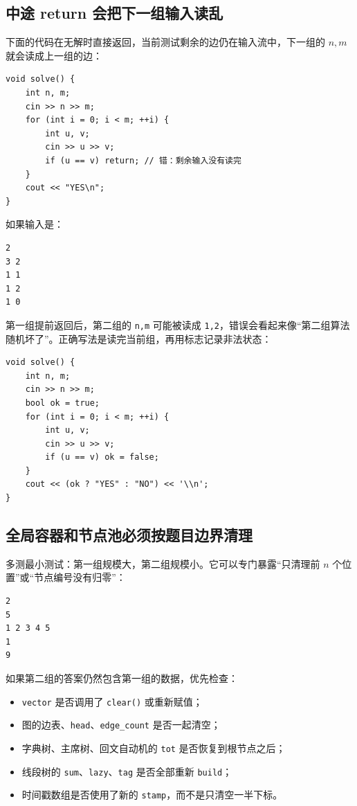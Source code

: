 \documentclass[UTF8,openany,oneside,zihao=-4]{ctexbook}
\begin{document}
\subsection{中途 return 会把下一组输入读乱}

下面的代码在无解时直接返回，当前测试剩余的边仍在输入流中，下一组的 $n,m$ 就会读成上一组的边：

\begin{lstlisting}
void solve() {
    int n, m;
    cin >> n >> m;
    for (int i = 0; i < m; ++i) {
        int u, v;
        cin >> u >> v;
        if (u == v) return; // 错：剩余输入没有读完
    }
    cout << "YES\n";
}
\end{lstlisting}

如果输入是：

\begin{lstlisting}
2
3 2
1 1
1 2
1 0
\end{lstlisting}

第一组提前返回后，第二组的 \lstinline|n,m| 可能被读成 \lstinline|1,2|，错误会看起来像“第二组算法随机坏了”。正确写法是读完当前组，再用标志记录非法状态：

\begin{lstlisting}
void solve() {
    int n, m;
    cin >> n >> m;
    bool ok = true;
    for (int i = 0; i < m; ++i) {
        int u, v;
        cin >> u >> v;
        if (u == v) ok = false;
    }
    cout << (ok ? "YES" : "NO") << '\\n';
}
\end{lstlisting}

\subsection{全局容器和节点池必须按题目边界清理}

多测最小测试：第一组规模大，第二组规模小。它可以专门暴露“只清理前 $n$ 个位置”或“节点编号没有归零”：

\begin{lstlisting}
2
5
1 2 3 4 5
1
9
\end{lstlisting}

如果第二组的答案仍然包含第一组的数据，优先检查：

\begin{itemize}
  \item \lstinline|vector| 是否调用了 \lstinline|clear()| 或重新赋值；
  \item 图的边表、\lstinline|head|、\lstinline|edge_count| 是否一起清空；
  \item 字典树、主席树、回文自动机的 \lstinline|tot| 是否恢复到根节点之后；
  \item 线段树的 \lstinline|sum|、\lstinline|lazy|、\lstinline|tag| 是否全部重新 \lstinline|build|；
  \item 时间戳数组是否使用了新的 \lstinline|stamp|，而不是只清空一半下标。
\end{itemize}
\end{document}
